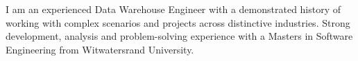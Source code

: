 


\begin{cventries}
\cventry
{} {} {} {} { %
	I am an experienced Data Warehouse Engineer with a demonstrated history of working with complex scenarios and projects across distinctive industries.	Strong development, analysis and problem-solving experience with a Masters in Software Engineering from Witwatersrand University.
}
\end{cventries}